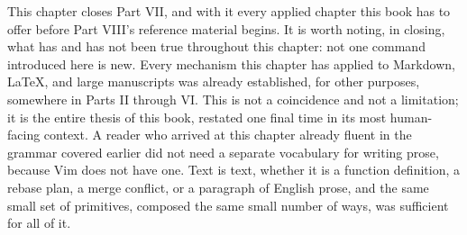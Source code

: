 This chapter closes Part VII, and with it every applied chapter this book has to offer before Part VIII's reference material begins. It is worth noting, in closing, what has and has not been true throughout this chapter: not one command introduced here is new. Every mechanism this chapter has applied to Markdown, LaTeX, and large manuscripts was already established, for other purposes, somewhere in Parts II through VI. This is not a coincidence and not a limitation; it is the entire thesis of this book, restated one final time in its most human-facing context. A reader who arrived at this chapter already fluent in the grammar covered earlier did not need a separate vocabulary for writing prose, because Vim does not have one. Text is text, whether it is a function definition, a rebase plan, a merge conflict, or a paragraph of English prose, and the same small set of primitives, composed the same small number of ways, was sufficient for all of it.
